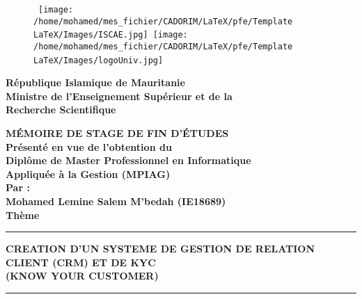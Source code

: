 \documentclass[a4paper, 12pt]{report}
\begin{document}
 
	\begin{titlepage}
		\begin{figure}[htbp]
			\hbox{
				\hspace*{-1.4cm}
				\texttt{[image: /home/mohamed/mes\_fichier/CADORIM/LaTeX/pfe/Template LaTeX/Images/ISCAE.jpg]}
				\hspace*{11cm}
				\texttt{[image: /home/mohamed/mes\_fichier/CADORIM/LaTeX/pfe/Template LaTeX/Images/logoUniv.jpg]}
			}
		\end{figure}
		\vspace {-4cm}
		
		\begin{center}
			\vspace{1cm}
			
			{\bf République Islamique de Mauritanie } \vspace{-0.2cm}\\
			{\bf	Ministre de l’Enseignement Supérieur et de la } \vspace{-0.2cm}\\
			
			{\bf Recherche Scientifique }\\
			
			\vspace{2cm}
			
			\bf{MÉMOIRE DE STAGE DE FIN D'ÉTUDES} \\
			\vspace{1cm}
			{\bf Présenté en vue de l’obtention du } \vspace{-0.2cm}\\
			{\bf Diplôme de Master Professionnel en Informatique}\vspace{-0.2cm}\\
				{\bf	Appliquée à la Gestion (MPIAG)}\\ \vspace{0.2cm}
				{\bf Par :}\\ \vspace{0.2cm}
					{\bf Mohamed Lemine Salem M’bedah (IE18689) }\\ \vspace{0.2cm}
			\huge{\textbf{Thème}}\\ 
			\noindent\rule{\textwidth}{1mm}
			\Large{\bf{CREATION D’UN SYSTEME DE GESTION DE RELATION CLIENT (CRM)  ET DE KYC  \\ (KNOW YOUR CUSTOMER)}}
			\noindent\rule{\textwidth}{1mm}
		\end{center}
		\vspace{0cm}
		\begin{center}
			

\end{center}
\end{titlepage}
\end{document}
